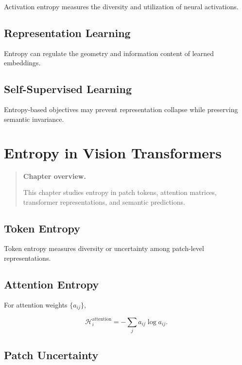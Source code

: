 \documentclass[11pt,oneside]{book}
\theoremstyle{remark}
\newcommand{\Entropy}{\mathcal{H}}
\newenvironment{chapteroverview}
{
	\begin{quote}
		\small
		\textbf{Chapter overview.}
	}
	{
	\end{quote}
}
\begin{document}
	Activation entropy measures the diversity and utilization of neural
	activations.
	
	\section{Representation Learning}
	
	Entropy can regulate the geometry and information content of learned
	embeddings.
	
	\section{Self-Supervised Learning}
	
	Entropy-based objectives may prevent representation collapse while preserving
	semantic invariance.
	
	
	\chapter{Entropy in Vision Transformers}
	\label{chap:vit-entropy}
	
	\begin{chapteroverview}
		This chapter studies entropy in patch tokens, attention matrices, transformer
		representations, and semantic predictions.
	\end{chapteroverview}
	
	\section{Token Entropy}
	
	Token entropy measures diversity or uncertainty among patch-level
	representations.
	
	\section{Attention Entropy}
	
	For attention weights \(\{a_{ij}\}\),
	
	\[
	\Entropy_i^{\mathrm{attention}}
	=
	-\sum_j a_{ij}\log a_{ij}.
	\]
	
	\section{Patch Uncertainty}
	
\end{document}
